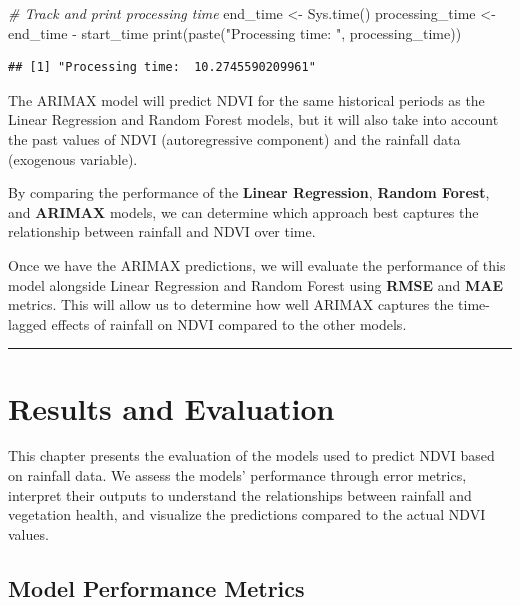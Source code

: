 \documentclass[
]{article}
\newenvironment{Shaded}{}{}
\newcommand{\CommentTok}[1]{\textcolor[rgb]{0.38,0.63,0.69}{\textit{#1}}}
\newcommand{\FunctionTok}[1]{\textcolor[rgb]{0.02,0.16,0.49}{#1}}
\newcommand{\NormalTok}[1]{#1}
\newcommand{\OtherTok}[1]{\textcolor[rgb]{0.00,0.44,0.13}{#1}}
\newcommand{\SpecialCharTok}[1]{\textcolor[rgb]{0.25,0.44,0.63}{#1}}
\newcommand{\StringTok}[1]{\textcolor[rgb]{0.25,0.44,0.63}{#1}}
\begin{document}
\begin{Shaded}
\begin{Highlighting}[]
\CommentTok{\# Track and print processing time}
\NormalTok{end\_time }\OtherTok{\textless{}{-}} \FunctionTok{Sys.time}\NormalTok{()}
\NormalTok{processing\_time }\OtherTok{\textless{}{-}}\NormalTok{ end\_time }\SpecialCharTok{{-}}\NormalTok{ start\_time}
\FunctionTok{print}\NormalTok{(}\FunctionTok{paste}\NormalTok{(}\StringTok{"Processing time: "}\NormalTok{, processing\_time))}
\end{Highlighting}
\end{Shaded}

\begin{verbatim}
## [1] "Processing time:  10.2745590209961"
\end{verbatim}

The ARIMAX model will predict NDVI for the same historical periods as
the Linear Regression and Random Forest models, but it will also take
into account the past values of NDVI (autoregressive component) and the
rainfall data (exogenous variable).

By comparing the performance of the \textbf{Linear Regression},
\textbf{Random Forest}, and \textbf{ARIMAX} models, we can determine
which approach best captures the relationship between rainfall and NDVI
over time.

Once we have the ARIMAX predictions, we will evaluate the performance of
this model alongside Linear Regression and Random Forest using
\textbf{RMSE} and \textbf{MAE} metrics. This will allow us to determine
how well ARIMAX captures the time-lagged effects of rainfall on NDVI
compared to the other models.

\begin{center}\rule{0.5\linewidth}{0.5pt}\end{center}

\section{Results and Evaluation}\label{results-and-evaluation}

This chapter presents the evaluation of the models used to predict NDVI
based on rainfall data. We assess the models' performance through error
metrics, interpret their outputs to understand the relationships between
rainfall and vegetation health, and visualize the predictions compared
to the actual NDVI values.

\subsection{Model Performance Metrics}\label{model-performance-metrics}
\end{document}
